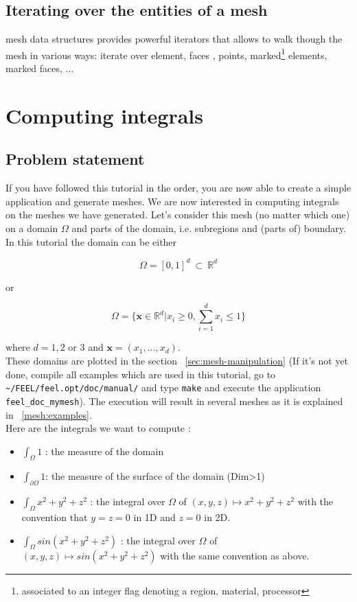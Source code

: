 \subsection{Iterating over the entities of a mesh}

\feel mesh data structures provides powerful iterators that allows to
walk though the mesh in various ways: iterate over element, faces ,
points, marked\footnote{associated to an integer flag denoting a
  region, material, processor} elements, marked faces, ...

\section{Computing integrals}
\label{sec:computing-integrals}

\subsection{Problem statement}

If you have followed this tutorial in the order, you are now able to create a simple application and generate meshes. We are now interested in computing integrals on the meshes we have generated. Let's consider this mesh (no matter which one) on a domain $\Omega$ and parts of the domain, i.e. subregions and (parts of) boundary. In this tutorial the domain can be either

\[ \Omega=[0,1]^d\ \subset\ \mathbb{R}^d \]

or

\[ \Omega=\{ \mathbf{x} \in \mathbb{R}^d | x_i \geq 0, \sum_{i=1}^{d} x_i \leq 1 \} \]

where $ d=1,2$ or $3$ and $\mathbf{x}=(x_1,...,x_d)$.\\ \newline
These domains are plotted in the section ~\ref{sec:mesh-manipulation} (If it's not yet done, compile all examples which are used in this tutorial, go to \lstinline!~/FEEL/feel.opt/doc/manual/! and type \verb|make| and execute the application \verb|feel_doc_mymesh|). The execution will result in several meshes as it is explained in ~\ref{mesh:examples}.\\
Here are the integrals we want to compute :
\begin{itemize}
\item $\displaystyle{ \int_\Omega 1 }$ : the measure of the domain
\item $\displaystyle{ \int_{\partial\Omega} 1 }$: the measure of the surface of the domain (Dim>1)
\item $ \displaystyle{\int_{\Omega} x^2+y^2+z^2 }$ : the integral over $\displaystyle{\Omega}$ of $ \displaystyle{(x,y,z) \mapsto x^2+y^2+z^2}$ with the convention that $y=z=0$ in 1D and $ z=0 $ in 2D.
\item $\displaystyle{ \int_{\Omega} sin(x^2+y^2+z^2)} $ : the integral over $\Omega$ of $\displaystyle{ (x,y,z) \mapsto sin(x^2+y^2+z^2)}$ with the same convention as above.
\end{itemize}

